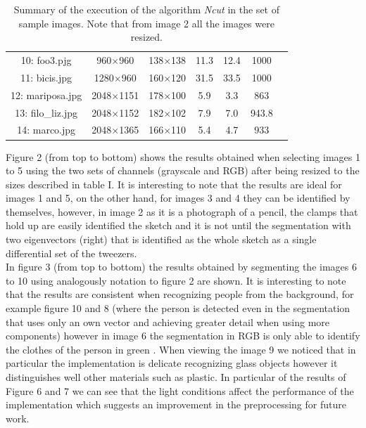 \documentclass[conference]{IEEEtran}
\theoremstyle{definition}
\begin{document}
\begin{table}[h]
\begin{center}
\begin{tabular}{c|cccccc}
10: foo3.pjg&960$\times$960&138$\times$138&11.3&12.4&1000\\
11: bicis.jpg&1280$\times$960& 160$\times$120&31.5&33.5&1000\\
12: mariposa.jpg&2048$\times$1151&178$\times$100&5.9&3.3&863\\
13: filo\_liz.jpg&2048$\times$1152& 182$\times$102&7.9&7.0&943.8\\
14: marco.jpg&2048$\times$1365& 166$\times$110&5.4&4.7&933\\
\hline
\end{tabular}
\caption{Summary of the execution of the algorithm \textit {Ncut} in the set of sample images. Note that from image 2 all the images were resized.}
\label{tresultados}
\end{center}
\end{table}
\FloatBarrier
Figure 2 (from top to bottom) shows the results obtained when selecting images 1 to 5 using the two sets of channels (grayscale and RGB) after being resized to the sizes described in table I. It is interesting to note that the results are ideal for images 1 and 5, on the other hand, for images 3 and 4 they can be identified by themselves, however, in image 2 as it is a photograph of a pencil, the clamps that hold up are easily identified the sketch and it is not until the segmentation with two eigenvectors (right) that is identified as the whole sketch as a single differential set of the tweezers. \\
In figure 3 (from top to bottom) the results obtained by segmenting the images 6 to 10 using analogously notation to figure 2 are shown. It is interesting to note that the results are consistent when recognizing people from the background, for example figure 10 and 8 (where the person is detected even in the segmentation that uses only an own vector and achieving greater detail when using more components) however in image 6 the segmentation in RGB is only able to identify the clothes of the person in green . When viewing the image 9 we noticed that in particular the implementation is delicate recognizing glass objects however it distinguishes well other materials such as plastic. In particular of the results of Figure 6 and 7 we can see that the light conditions affect the performance of the implementation which suggests an improvement in the preprocessing for future work. \\
\end{document}
